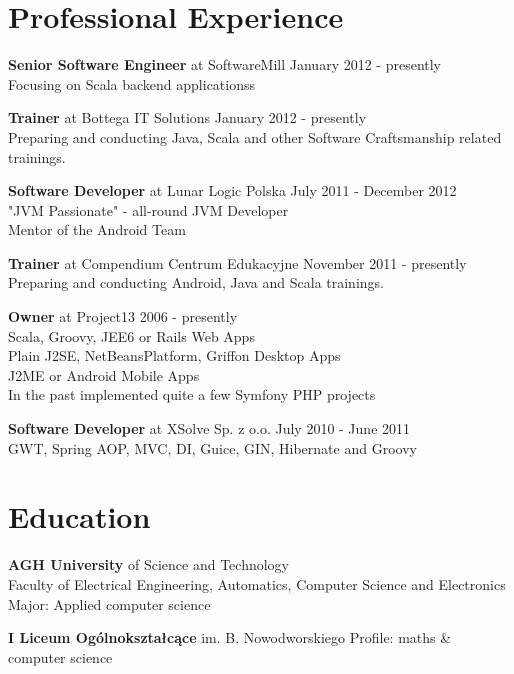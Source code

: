 \documentclass{res}
\begin{document}
\begin{resume} 

\section{Professional Experience}
{\bf Senior Software Engineer} at SoftwareMill \hfill January 2012 - presently \\ 
    Focusing on Scala backend applicationss

{\bf Trainer} at Bottega IT Solutions \hfill January 2012 - presently \\ 
	Preparing and conducting Java, Scala and other Software Craftsmanship related trainings.
    
{\bf Software Developer} at Lunar Logic Polska \hfill July 2011 - December 2012 \\ 
    "JVM Passionate" - all-round JVM Developer \\ 
    Mentor of the Android Team  

{\bf Trainer} at Compendium Centrum Edukacyjne \hfill November 2011 - presently \\ 
	Preparing and conducting Android, Java and Scala trainings.
    
{\bf Owner} at Project13 \hfill 2006 - presently\\
	Scala, Groovy, JEE6 or Rails Web Apps \\
	Plain J2SE, NetBeansPlatform, Griffon Desktop Apps \\
	J2ME or Android Mobile Apps \\
	In the past implemented quite a few Symfony PHP projects


{\bf Software Developer} at XSolve Sp. z o.o. \hfill July 2010 - June 2011\\
	GWT, Spring {AOP, MVC, DI}, Guice, GIN, Hibernate and Groovy

\section{Education} 
{\bf AGH University} of Science and Technology\\ 
	Faculty of Electrical Engineering, Automatics, Computer Science and Electronics\\
	Major: Applied computer science

{\bf I Liceum Ogólnokształcące} im. B. Nowodworskiego 
	Profile: maths \& computer science


\end{resume}
\end{document}

